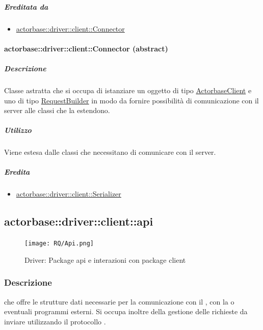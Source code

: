 \documentclass{scalatekids-article}
\begin{document}
\subparagraph{Ereditata da}

\begin{itemize}
\item \hyperref[sec:actorbase::driver::client::Connector]{actorbase::driver::client::Connector}
\end{itemize}

\paragraph{actorbase::driver::client::Connector (abstract)}
\label{sec:actorbase::driver::client::Connector}

\subparagraph{Descrizione}

Classe astratta che si occupa di istanziare un oggetto di tipo
\hyperref[sec:actorbase::driver::client::ActorbaseClient]{ActorbaseClient} e uno
di tipo
\hyperref[sec:actorbase::driver::client::api::RequestBuilder]{RequestBuilder} in
modo da fornire possibilità di comunicazione con il server alle classi che la
estendono.

\subparagraph{Utilizzo}

Viene estesa dalle classi che necessitano di comunicare con il server.

\subparagraph{Eredita}

\begin{itemize}
\item \hyperref[sec:actorbase::driver::client::Serializer]{actorbase::driver::client::Serializer}
\end{itemize}

\subsection{actorbase::driver::client::api}
\label{sec:actorbase::driver::client::api}

\begin{figure}[H]
  \begin{center}
    \texttt{[image: RQ/Api.png]}
    \caption{Driver: Package api e interazioni con package client}
  \end{center}
\end{figure}

\subsubsection{Descrizione}

 che offre le strutture dati necessarie per la comunicazione con
il , con la  o eventuali programmi esterni. Si occupa
inoltre della gestione delle richieste  da inviare utilizzando il
protocollo .
\end{document}
